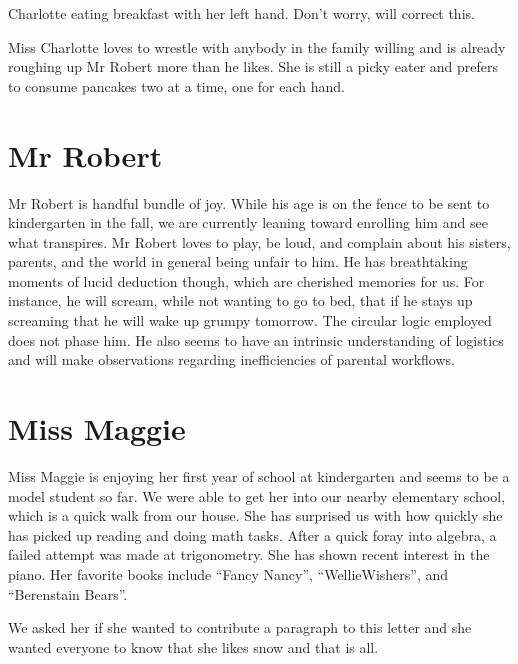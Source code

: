 \documentclass[letterpaper,11pt]{article}
\makeatletter
\newenvironment{figurehere}
  {\def\@captype{figure}}
  {}
\makeatother
\begin{document}
\begin{multicols}{2}
\bigskip

\begin{figurehere}
 \centering   
 \caption{Charlotte eating breakfast with her left hand. Don't worry, will correct this.}
\end{figurehere}

\bigskip

Miss Charlotte loves to wrestle with anybody in the family willing and is already
roughing up Mr Robert more than he likes.  She is still a picky eater and prefers
to consume pancakes two at a time, one for each hand.

\section{Mr Robert}

Mr Robert is handful bundle of joy.  While his age is on the fence to be sent
to kindergarten in the fall, we are currently leaning toward enrolling him and
see what transpires. Mr Robert loves to play, be loud, and complain about his sisters,
parents, and the world in general being unfair to him.  He has breathtaking moments of
lucid deduction though, which are cherished memories for us.  For instance, he will
scream, while not wanting to go to bed, that if he stays up screaming that he will 
wake up grumpy tomorrow. The circular logic employed does not phase him.
He also seems to have an intrinsic understanding of
logistics and will make observations regarding inefficiencies of parental
workflows.

\section{Miss Maggie}

Miss Maggie is enjoying her first year of school at kindergarten and seems to be
a model student so far.  We were able to get her into our nearby elementary school,
which is a quick walk from our house.  She has surprised us with how quickly she
has picked up reading and doing math tasks.  After a quick foray into algebra,
a failed attempt was made at trigonometry.  She has shown recent interest in
the piano. Her favorite books include
\enquote{Fancy Nancy}, \enquote{WellieWishers\texttrademark}, and
\enquote{Berenstain Bears}.

We asked her if she wanted to contribute a paragraph to this letter and she wanted
everyone to know that she likes snow and that is all.


\end{multicols}
\end{document}
